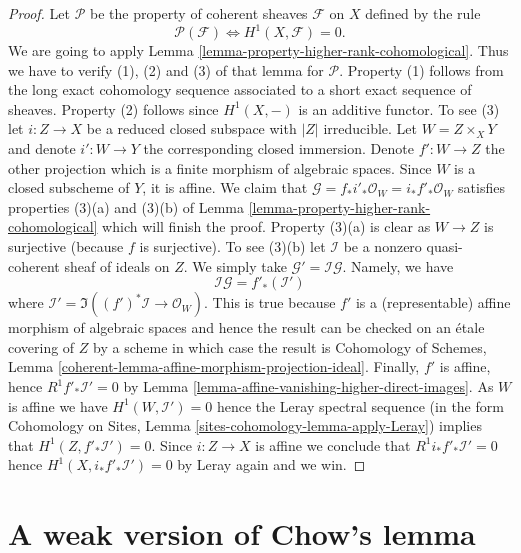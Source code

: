 \begin{proof}
\medskip\noindent
Let $\mathcal{P}$ be the property of coherent sheaves
$\mathcal{F}$ on $X$ defined by the rule
$$
\mathcal{P}(\mathcal{F}) \Leftrightarrow H^1(X, \mathcal{F}) = 0.
$$
We are going to apply Lemma \ref{lemma-property-higher-rank-cohomological}.
Thus we have to verify (1), (2) and (3) of that lemma for $\mathcal{P}$.
Property (1) follows from the long exact cohomology sequence associated
to a short exact sequence of sheaves. Property (2) follows since
$H^1(X, -)$ is an additive functor. To see (3) let $i : Z \to X$ be
a reduced closed subspace with $|Z|$ irreducible. Let $W = Z \times_X Y$
and denote $i' : W \to Y$ the corresponding closed immersion.
Denote $f' : W \to Z$ the other projection which is a finite
morphism of algebraic spaces. Since $W$ is a closed subscheme of $Y$, it
is affine. We claim that
$\mathcal{G} = f_*i'_*\mathcal{O}_W = i_*f'_*\mathcal{O}_W$
satisfies properties (3)(a) and (3)(b) of
Lemma \ref{lemma-property-higher-rank-cohomological}
which will finish the proof. Property (3)(a) is clear as $W \to Z$ is
surjective (because $f$ is surjective). To see (3)(b) let
$\mathcal{I}$ be a nonzero quasi-coherent sheaf of ideals on $Z$.
We simply take $\mathcal{G}' = \mathcal{I} \mathcal{G}$.
Namely, we have
$$
\mathcal{I} \mathcal{G} = f'_*(\mathcal{I}')
$$
where $\mathcal{I}' = \Im((f')^*\mathcal{I} \to \mathcal{O}_W)$.
This is true because $f'$ is a (representable) affine morphism of
algebraic spaces and hence the result can be checked on an \'etale
covering of $Z$ by a scheme in which case the result is
Cohomology of Schemes, Lemma
\ref{coherent-lemma-affine-morphism-projection-ideal}.
Finally, $f'$ is affine, hence $R^1f'_*\mathcal{I}' = 0$ by
Lemma \ref{lemma-affine-vanishing-higher-direct-images}.
As $W$ is affine we have $H^1(W, \mathcal{I}') = 0$ hence the Leray
spectral sequence (in the form
Cohomology on Sites, Lemma \ref{sites-cohomology-lemma-apply-Leray})
implies that $H^1(Z, f'_*\mathcal{I}') = 0$.
Since $i : Z \to X$ is affine we conclude that
$R^1i_*f'_*\mathcal{I}' = 0$ hence $H^1(X, i_*f'_*\mathcal{I}') = 0$
by Leray again and we win.
\end{proof}








\section{A weak version of Chow's lemma}
\label{section-weak-chow}


